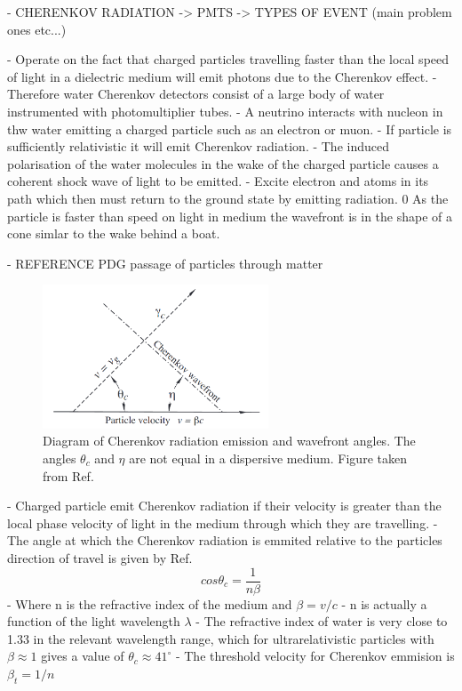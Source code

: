 - CHERENKOV RADIATION -> PMTS -> TYPES OF EVENT (main problem ones etc...)

- Operate on the fact that charged particles travelling faster than the local speed of light in a
dielectric medium will emit photons due to the Cherenkov effect.
- Therefore water Cherenkov detectors consist of a large body of water instrumented with
photomultiplier tubes.
- A neutrino interacts with nucleon in thw water emitting a charged particle such as an electron or
muon.
- If particle is sufficiently relativistic it will emit Cherenkov radiation.
- The induced polarisation of the water molecules in the wake of the charged particle causes a
coherent shock wave of light to be emitted.
- Excite electron and atoms in its path which then must return to the ground state by emitting
radiation.
0 As the particle is faster than speed on light in medium the wavefront is in the shape of a cone
simlar to the wake behind a boat.

- REFERENCE PDG passage of particles through matter

\begin{figure} %
    \includegraphics[width=0.6\textwidth]{diagrams/4-chips/cherenkov.png}
    \caption[Diagram of Cherenkov radiation.]
    {Diagram of Cherenkov radiation emission and wavefront angles. The angles $\theta_{c}$ and
        $\eta$ are not equal in a dispersive medium. Figure taken from Ref.~\cite{particle2020}
    }
    \label{fig:cherenkov}
\end{figure}

- Charged particle emit Cherenkov radiation if their velocity is greater than the local phase
velocity of light in the medium through which they are travelling.
- The angle at which the Cherenkov radiation is emmited relative to the particles direction of
travel is given by Ref.~\cite{particle2020}
\begin{equation}
    cos\theta_{c} = \frac{1}{n\beta}
    \label{eq:cherenkov_angle}
\end{equation}
- Where n is the refractive index of the medium and $\beta=v/c$
- n is actually a function of the light wavelength $\lambda$
- The refractive index of water is very close to 1.33 in the relevant wavelength range, which for
ultrarelativistic particles with $\beta\approx 1$ gives a value of $\theta_{c}\approx 41^{\circ}$
- The threshold velocity for Cherenkov emmision is $\beta_{t}=1/n$

